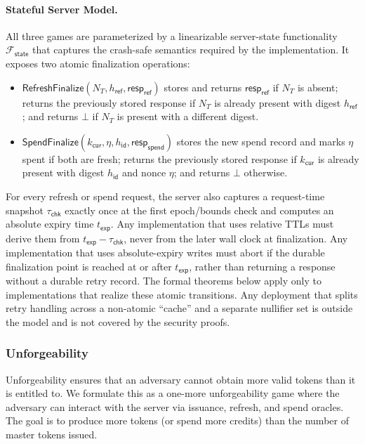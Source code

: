 \documentclass[11pt]{article}
\theoremstyle{definitionstyle}
\theoremstyle{plain}
\begin{document}
\paragraph{Stateful Server Model.}
All three games are parameterized by a linearizable server-state functionality $\mathcal{F}_{\mathsf{state}}$ that captures the crash-safe semantics required by the implementation.  It exposes two atomic finalization operations:
\begin{itemize}[leftmargin=*]
\item $\mathsf{RefreshFinalize}(N_T, h_{\mathsf{ref}}, \mathsf{resp}_{\mathsf{ref}})$ stores and returns $\mathsf{resp}_{\mathsf{ref}}$ if $N_T$ is absent; returns the previously stored response if $N_T$ is already present with digest $h_{\mathsf{ref}}$; and returns $\bot$ if $N_T$ is present with a different digest.
\item $\mathsf{SpendFinalize}(k_{\mathsf{cur}}, \eta, h_{\mathsf{id}}, \mathsf{resp}_{\mathsf{spend}})$ stores the new spend record and marks $\eta$ spent if both are fresh; returns the previously stored response if $k_{\mathsf{cur}}$ is already present with digest $h_{\mathsf{id}}$ and nonce $\eta$; and returns $\bot$ otherwise.
\end{itemize}
For every refresh or spend request, the server also captures a request-time snapshot $\tau_{\mathsf{chk}}$ exactly once at the first epoch/bounds check and computes an absolute expiry time $t_{\mathsf{exp}}$. Any implementation that uses relative TTLs must derive them from $t_{\mathsf{exp}}-\tau_{\mathsf{chk}}$, never from the later wall clock at finalization. Any implementation that uses absolute-expiry writes must abort if the durable finalization point is reached at or after $t_{\mathsf{exp}}$, rather than returning a response without a durable retry record.
The formal theorems below apply only to implementations that realize these atomic transitions.  Any deployment that splits retry handling across a non-atomic ``cache'' and a separate nullifier set is outside the model and is not covered by the security proofs.

\subsubsection{Unforgeability}
Unforgeability ensures that an adversary cannot obtain more valid tokens than it is entitled to. We formulate this as a one-more unforgeability game where the adversary can interact with the server via issuance, refresh, and spend oracles. The goal is to produce more tokens (or spend more credits) than the number of master tokens issued.
\end{document}
